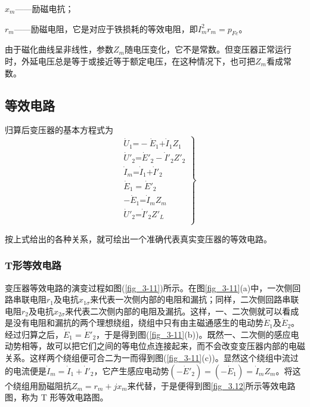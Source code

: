 \documentclass{book}
\begin{document}
${{x}_{m}}$——励磁电抗；

${{r}_{m}}$——励磁电阻，它是对应于铁损耗的等效电阻，即$I_{m}^{2}{{r}_{m}}={{p}_{Fe}}$。

由于磁化曲线呈非线性，参数${{Z}_{m}}$随电压变化，它不是常数。但变压器正常运行时，外延电压总是等于或接近等于额定电压，在这种情况下，也可把${{Z}_{m}}$看成常数。

\subsection{等效电路}
归算后变压器的基本方程式为
\begin{equation}
\left. \begin{aligned}
& {{{\dot{U}}}_{1}}\text{=}-{{{\dot{E}}}_{1}}\text{+}{{{\dot{I}}}_{1}}{{Z}_{1}} \\ 
& {{{{\dot{U}}'}}_{2}}\text{=}{{{{\dot{E}}'}}_{2}}-{{{{\dot{I}}'}}_{2}}{{{{Z}'}}_{2}} \\ 
& {{{\dot{I}}}_{m}}\text{=}{{{\dot{I}}}_{1}}\text{+}{{{{\dot{I}}'}}_{2}} \\ 
& {{{\dot{E}}}_{1}}={{{{\dot{E}}'}}_{2}} \\ 
& -{{{\dot{E}}}_{1}}\text{=}{{{\dot{I}}}_{m}}{{Z}_{m}} \\ 
& {{{{\dot{U}}'}}_{2}}\text{=}{{{{\dot{I}}'}}_{2}}{{{{Z}'}}_{L}} \\ 
\end{aligned} \right\}
\label{2-36}
\end{equation}

按上式给出的各种关系，就可绘出一个准确代表真实变压器的等效电路。

\subsubsection{T形等效电路}
变压器等效电路的演变过程如图(\ref{fig_3-11})所示。在图\ref{fig_3-11}(a)中，一次侧回路串联电阻${{r}_{1}}$及电抗${{x}_{1\sigma }}$来代表一次侧内部的电阻和漏抗；同样，二次侧回路串联电阻${{r}_{2}}$及电抗${{x}_{2\sigma }}$来代表二次侧内部的电阻及漏抗。这样，一、二次侧就可以看成是没有电阻和漏抗的两个理想绕组，绕组中只有由主磁通感生的电动势${{\dot{E}}_{1}}$及${{\dot{E}}_{2}}$。经过归算之后，${{\dot{E}}_{1}}={{{\dot{E}}'}_{2}}$，于是得到图(\ref{fig_3-11}(b))。既然一、二次侧的感应电动势相等，故可以把它们之间的等电位点连接起来，而不会改变变压器内部的电磁关系。这样两个绕组便可合二为一而得到图(\ref{fig_3-11}(c))。显然这个绕组中流过的电流便是${{\dot{I}}_{m}}={{\dot{I}}_{1}}+{{{\dot{I}}'}_{2}}$，它产生感应电动势$(-{{{\dot{E}}'}_{2}})=(-{{\dot{E}}_{1}})={{\dot{I}}_{m}}{{Z}_{m}}$。将这个绕组用励磁阻抗${{Z}_{m}}={{r}_{m}}+j{{x}_{m}}$来代替，于是便得到图\ref{fig_3.12}所示等效电路图，称为 T 形等效电路图。
\end{document}

